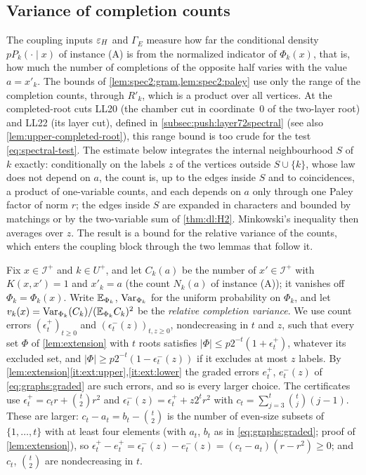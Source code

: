 \subsection{Variance of completion counts}\label{subsec:spec:completion-variance}

The coupling inputs $\varepsilon_H$ and $\Gamma_E$ measure how far the conditional density
$pP_k(\cdot\mid x)$ of instance (A) is from the normalized indicator of $\Phi_k(x)$,
that is, how much the number of completions of the opposite half varies with the
value $a=x'_k$. The bounds of \cref{lem:spec2:gram,lem:spec2:paley} use only the
range of the completion counts, through $R'_k$, which is a product over all
vertices. At the completed-root cuts LL20 (the chamber cut in coordinate~0 of the two-layer root) and LL22 (its layer cut), defined in \cref{subsec:push:layer72spectral} (see also \cref{lem:upper-completed-root}), this range bound is too crude for the test \eqref{eq:spectral-test}. The estimate below integrates the
internal neighbourhood $S$ of $k$ exactly: conditionally on the labels $z$ of the
vertices outside $S\cup\{k\}$, whose law does not depend on $a$, the count is,
up to the edges inside $S$ and to coincidences, a product of one-variable counts,
and each depends on $a$ only through one Paley factor of norm $r$; the edges inside
$S$ are expanded in characters and bounded by matchings or by the two-variable
sum of \cref{thm:dl:H2}. Minkowski's inequality then averages over $z$. The result is
a bound for the relative variance of the counts, which enters the coupling block
through the two lemmas that follow it.

Fix $x\in\mathcal I^+$ and $k\in U^+$, and let $C_k(a)$ be the number of
$x'\in\mathcal I^+$ with $K(x,x')=1$ and $x'_k=a$ (the count $N_k(a)$ of instance
(A)); it vanishes off $\Phi_k=\Phi_k(x)$. Write $\mathbb E_{\Phi_k}$, $\operatorname{Var}_{\Phi_k}$ for the
uniform probability on $\Phi_k$, and let
$v_k(x)=\operatorname{Var}_{\Phi_k}(C_k)/(\mathbb E_{\Phi_k}C_k)^2$ be the \emph{relative completion variance}.
We use count errors $(\epsilon^+_t)_{t\ge0}$ and $(\epsilon^-_t(z))_{t,z\ge0}$, nondecreasing
in $t$ and $z$, such that every set $\Phi$ of \cref{lem:extension} with $t$ roots
satisfies $|\Phi|\le p2^{-t}(1+\epsilon^+_t)$, whatever its excluded set, and
$|\Phi|\ge p2^{-t}(1-\epsilon^-_t(z))$ if it excludes at most $z$ labels. By
\cref{lem:extension}\ref{it:ext:upper},\ref{it:ext:lower} the graded errors
$e^+_t$, $e^-_t(z)$ of \eqref{eq:graphs:graded} are such errors, and so is every
larger choice. The certificates use $\epsilon^+_t=c_tr+\binom t2r^2$ and
$\epsilon^-_t(z)=\epsilon^+_t+z2^tr^2$ with $c_t=\sum_{j=3}^t\binom tj(j-1)$. These are
larger: $c_t-a_t=b_t-\binom t2$ is the number of even-size subsets of $\{1,\dots,t\}$
with at least four elements (with $a_t$, $b_t$ as in \eqref{eq:graphs:graded}; proof of \cref{lem:extension}), so $\epsilon^+_t-e^+_t=\epsilon^-_t(z)-e^-_t(z)=(c_t-a_t)(r-r^2)\ge0$;
and $c_t$, $\binom t2$ are nondecreasing in $t$.

